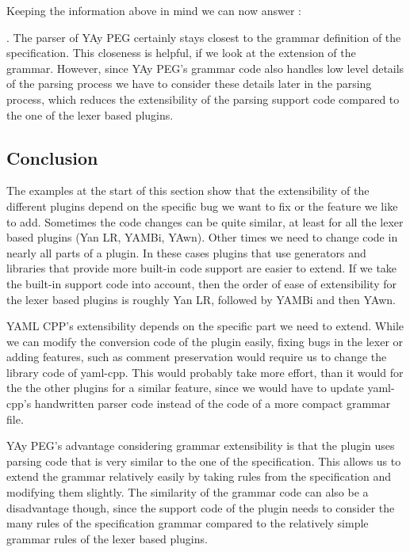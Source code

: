 Keeping the information above in mind we can now answer :

  \closeness*

. The parser of YAy PEG certainly stays closest to the grammar definition of the  specification. This closeness is helpful, if we look at the extension of the grammar. However, since YAy PEG’s grammar code also handles low level details of the parsing process we have to consider these details later in the parsing process, which reduces the extensibility of the parsing support code compared to the one of the lexer based plugins.

\subsection{Conclusion}

The examples at the start of this section show that the extensibility of the different  plugins depend on the specific bug we want to fix or the feature we like to add. Sometimes the code changes can be quite similar, at least for all the lexer based plugins (Yan LR, YAMBi, YAwn). Other times we need to change code in nearly all parts of a plugin. In these cases plugins that use generators and libraries that provide more built-in code support are easier to extend. If we take the built-in support code into account, then the order of ease of extensibility for the lexer based plugins is roughly Yan LR, followed by YAMBi and then YAwn.

YAML CPP’s extensibility depends on the specific part we need to extend. While we can modify the conversion code of the plugin easily, fixing bugs in the lexer or adding features, such as comment preservation would require us to change the library code of yaml-cpp. This would probably take more effort, than it would for the the other  plugins for a similar feature, since we would have to update yaml-cpp’s handwritten parser code instead of the code of a more compact grammar file.

YAy PEG’s advantage considering grammar extensibility is that the plugin uses parsing code that is very similar to the one of the  specification. This allows us to extend the grammar relatively easily by taking rules from the  specification and modifying them slightly. The similarity of the grammar code can also be a disadvantage though, since the support code of the plugin needs to consider the many rules of the specification grammar compared to the relatively simple grammar rules of the lexer based plugins.


